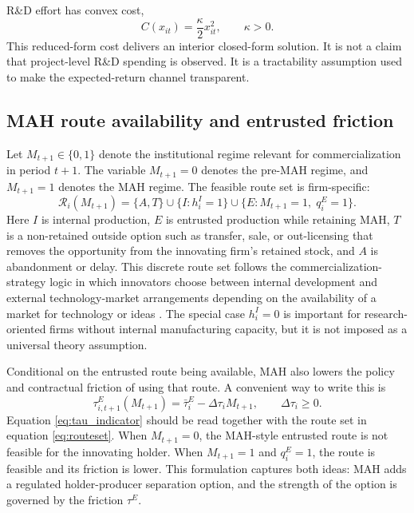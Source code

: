 \documentclass[12pt]{article}
\newcommand{\1}{\mathbf{1}}
\newcommand{\calR}{\mathcal{R}}
\begin{document}
R\&D effort has convex cost,
\begin{equation}
    C(x_{it})=\frac{\kappa}{2}x_{it}^2,\qquad \kappa>0.
    \label{eq:rdcost}
\end{equation}
This reduced-form cost delivers an interior closed-form solution. It is not a claim that project-level R\&D spending is observed. It is a tractability assumption used to make the expected-return channel transparent.

\subsection{MAH route availability and entrusted friction}

Let $M_{t+1}\in\{0,1\}$ denote the institutional regime relevant for commercialization in period $t+1$. The variable $M_{t+1}=0$ denotes the pre-MAH regime, and $M_{t+1}=1$ denotes the MAH regime. The feasible route set is firm-specific:
\begin{equation}
    \calR_i(M_{t+1})
    =
    \{A,T\}
    \cup \{I:h_i^I=1\}
    \cup \{E:M_{t+1}=1,\;q_i^E=1\}.
    \label{eq:routeset}
\end{equation}
Here $I$ is internal production, $E$ is entrusted production while retaining MAH, $T$ is a non-retained outside option such as transfer, sale, or out-licensing that removes the opportunity from the innovating firm's retained stock, and $A$ is abandonment or delay. This discrete route set follows the commercialization-strategy logic in which innovators choose between internal development and external technology-market arrangements depending on the availability of a market for technology or ideas \citep{AroraFosfuriGambardella2001,GansStern2003}. The special case $h_i^I=0$ is important for research-oriented firms without internal manufacturing capacity, but it is not imposed as a universal theory assumption.

Conditional on the entrusted route being available, MAH also lowers the policy and contractual friction of using that route. A convenient way to write this is
\begin{equation}
    \tau^E_{i,t+1}(M_{t+1})=\bar\tau_i^E-\Delta\tau_i M_{t+1},\qquad \Delta\tau_i\ge0.
    \label{eq:tau_indicator}
\end{equation}
Equation \eqref{eq:tau_indicator} should be read together with the route set in equation \eqref{eq:routeset}. When $M_{t+1}=0$, the MAH-style entrusted route is not feasible for the innovating holder. When $M_{t+1}=1$ and $q_i^E=1$, the route is feasible and its friction is lower. This formulation captures both ideas: MAH adds a regulated holder-producer separation option, and the strength of the option is governed by the friction $\tau^E$.
\end{document}

